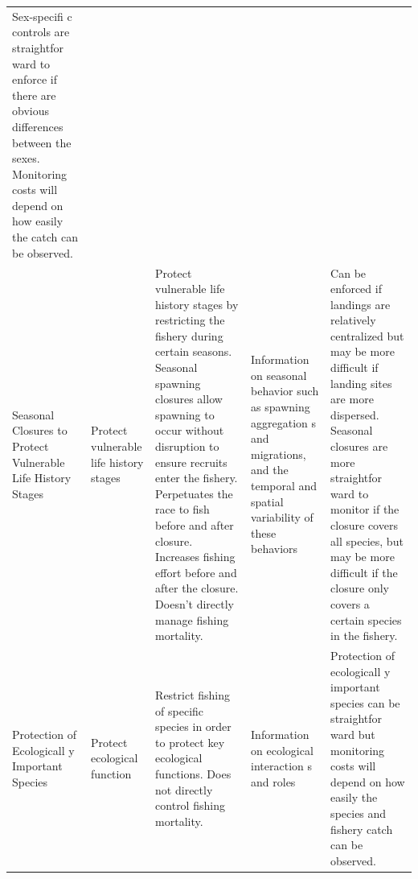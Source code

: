 \documentclass[]{book}
\begin{document}
\begin{longtable}[]{@{}lllll@{}}
\begin{minipage}[t]{0.17\columnwidth}
Sex-specifi c controls are straightfor ward to enforce if there are
obvious differences between the sexes. Monitoring costs will depend on
how easily the catch can be observed.\strut
\end{minipage}\tabularnewline
\begin{minipage}[t]{0.17\columnwidth}\raggedright\strut
Seasonal Closures to Protect Vulnerable Life History Stages\strut
\end{minipage} & \begin{minipage}[t]{0.17\columnwidth}\raggedright\strut
Protect vulnerable life history stages\strut
\end{minipage} & \begin{minipage}[t]{0.17\columnwidth}\raggedright\strut
Protect vulnerable life history stages by restricting the fishery during
certain seasons. Seasonal spawning closures allow spawning to occur
without disruption to ensure recruits enter the fishery. Perpetuates the
race to fish before and after closure. Increases fishing effort before
and after the closure. Doesn't directly manage fishing mortality.\strut
\end{minipage} & \begin{minipage}[t]{0.17\columnwidth}\raggedright\strut
Information on seasonal behavior such as spawning aggregation s and
migrations, and the temporal and spatial variability of these
behaviors\strut
\end{minipage} & \begin{minipage}[t]{0.17\columnwidth}\raggedright\strut
Can be enforced if landings are relatively centralized but may be more
difficult if landing sites are more dispersed. Seasonal closures are
more straightfor ward to monitor if the closure covers all species, but
may be more difficult if the closure only covers a certain species in
the fishery.\strut
\end{minipage}\tabularnewline
\begin{minipage}[t]{0.17\columnwidth}\raggedright\strut
Protection of Ecologicall y Important Species\strut
\end{minipage} & \begin{minipage}[t]{0.17\columnwidth}\raggedright\strut
Protect ecological function\strut
\end{minipage} & \begin{minipage}[t]{0.17\columnwidth}\raggedright\strut
Restrict fishing of specific species in order to protect key ecological
functions. Does not directly control fishing mortality.\strut
\end{minipage} & \begin{minipage}[t]{0.17\columnwidth}\raggedright\strut
Information on ecological interaction s and roles\strut
\end{minipage} & \begin{minipage}[t]{0.17\columnwidth}\raggedright\strut
Protection of ecologicall y important species can be straightfor ward
but monitoring costs will depend on how easily the species and fishery
catch can be observed.\strut
\end{minipage}\tabularnewline
\bottomrule
\end{longtable}
\end{document}
